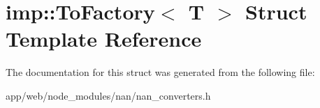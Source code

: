 \hypertarget{structimp_1_1_to_factory}{}\section{imp\+:\+:To\+Factory$<$ T $>$ Struct Template Reference}
\label{structimp_1_1_to_factory}


The documentation for this struct was generated from the following file\+:\begin{DoxyCompactItemize}
\item 
app/web/node\+\_\+modules/nan/nan\+\_\+converters.\+h\end{DoxyCompactItemize}
